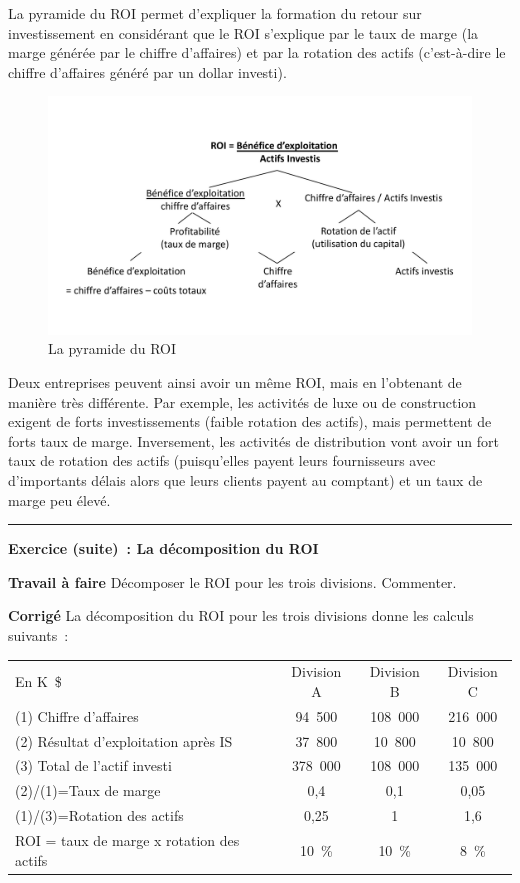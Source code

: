 \documentclass[oneside]{kaobook}
\begin{document}
La pyramide du ROI permet d'expliquer la formation du retour sur investissement en considérant que le ROI s'explique par le taux de marge (la marge générée par le chiffre d'affaires) et par la rotation des actifs (c'est-à-dire le chiffre d'affaires généré par un dollar investi).

\begin{figure}[H]

\includegraphics{./img/roi.pdf}
\caption{La pyramide du ROI}
\end{figure}

Deux entreprises peuvent ainsi avoir un même ROI, mais en l'obtenant de manière très différente. Par exemple, les activités de luxe ou de construction exigent de forts investissements (faible rotation des actifs), mais permettent de forts taux de marge. Inversement, les activités de distribution vont avoir un fort taux de rotation des actifs (puisqu'elles payent leurs fournisseurs avec d'importants délais alors que leurs clients payent au comptant) et un taux de marge peu élevé.

\noindent\rule{\textwidth}{0.5pt}
\textbf{Exercice (suite) : La décomposition du ROI}

\textbf{Travail à faire}
Décomposer le ROI pour les trois divisions. Commenter.

\textbf{Corrigé}
La décomposition du ROI pour les trois divisions donne les calculs suivants :
\begin{center}
\footnotesize
\begin{tabular}{l c c c}
En K \$ & Division A & Division B & Division C\\
(1) Chiffre d'affaires & 94 500 & 108 000 & 216 000\\
(2) Résultat d'exploitation après IS & 37 800 & 10 800 & 10 800\\
(3) Total de l'actif investi & 378 000 & 108 000 & 135 000\\
(2)/(1)=Taux de marge & 0,4 & 0,1 & 0,05\\
(1)/(3)=Rotation des actifs & 0,25 & 1 & 1,6\\
ROI = taux de marge x rotation des actifs & 10 \% & 10 \% & 8 \%\\
\end{tabular}
\end{center}
\end{document}
